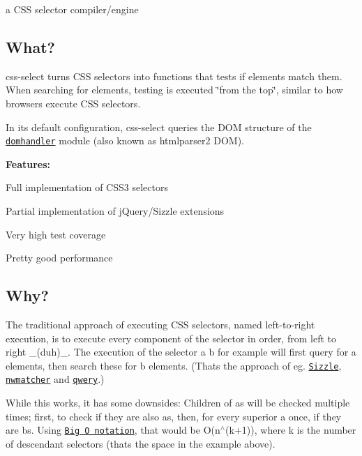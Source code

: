 a C\+SS selector compiler/engine

\subsection*{What?}

css-\/select turns C\+SS selectors into functions that tests if elements match them. When searching for elements, testing is executed \char`\"{}from the top\char`\"{}, similar to how browsers execute C\+SS selectors.

In its default configuration, css-\/select queries the D\+OM structure of the \href{https://github.com/fb55/domhandler}{\tt {\ttfamily domhandler}} module (also known as htmlparser2 D\+OM).

{\bfseries Features\+:}


\begin{DoxyItemize}
\item Full implementation of C\+S\+S3 selectors
\item Partial implementation of j\+Query/\+Sizzle extensions
\item Very high test coverage
\item Pretty good performance
\end{DoxyItemize}

\subsection*{Why?}

The traditional approach of executing C\+SS selectors, named left-\/to-\/right execution, is to execute every component of the selector in order, from left to right \+\_\+(duh)\+\_\+. The execution of the selector {\ttfamily a b} for example will first query for {\ttfamily a} elements, then search these for {\ttfamily b} elements. (That\textquotesingle{}s the approach of eg. \href{https://github.com/jquery/sizzle}{\tt {\ttfamily Sizzle}}, \href{https://github.com/dperini/nwmatcher/}{\tt {\ttfamily nwmatcher}} and \href{https://github.com/ded/qwery}{\tt {\ttfamily qwery}}.)

While this works, it has some downsides\+: Children of {\ttfamily a}s will be checked multiple times; first, to check if they are also {\ttfamily a}s, then, for every superior {\ttfamily a} once, if they are {\ttfamily b}s. Using \href{http://en.wikipedia.org/wiki/Big_O_notation}{\tt Big O notation}, that would be {\ttfamily O(n$^\wedge$(k+1))}, where {\ttfamily k} is the number of descendant selectors (that\textquotesingle{}s the space in the example above).

